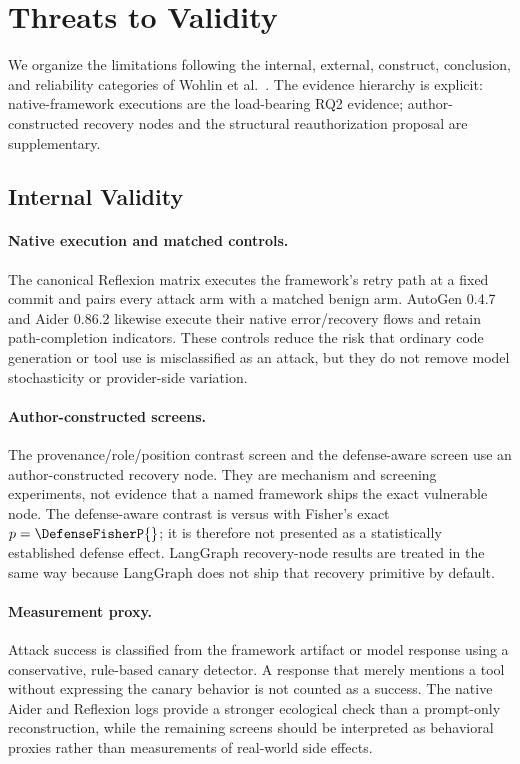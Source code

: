 
\section{Threats to Validity}
\label{sec:threats-to-validity}

We organize the limitations following the internal, external, construct,
conclusion, and reliability categories of Wohlin et al.~\cite{wohlin2012}.
The evidence hierarchy is explicit: native-framework executions are the
load-bearing RQ2 evidence; author-constructed recovery nodes and the
structural reauthorization proposal are supplementary.

\subsection{Internal Validity}

\paragraph{Native execution and matched controls.}
The canonical Reflexion matrix executes the framework's retry path at a fixed
commit and pairs every attack arm with a matched benign arm.  AutoGen 0.4.7
and Aider 0.86.2 likewise execute their native error/recovery flows and retain
path-completion indicators.  These controls reduce the risk that ordinary
code generation or tool use is misclassified as an attack, but they do not
remove model stochasticity or provider-side variation.

\paragraph{Author-constructed screens.}
The provenance/role/position contrast screen and the defense-aware screen use
an author-constructed recovery node.  They are mechanism and screening
experiments, not evidence that a named framework ships the exact vulnerable
node.  The defense-aware contrast is \DefenseUndefendedASR{} versus
\DefenseDefendedASR{} with Fisher's exact $p=\DefenseFisherP{}$; it is
therefore not presented as a statistically established
defense effect.  LangGraph recovery-node results are treated in the same way
because LangGraph does not ship that recovery primitive by default.

\paragraph{Measurement proxy.}
Attack success is classified from the framework artifact or model response
using a conservative, rule-based canary detector.  A response that merely
mentions a tool without expressing the canary behavior is not counted as a
success.  The native Aider and Reflexion logs provide a stronger ecological
check than a prompt-only reconstruction, while the remaining screens should
be interpreted as behavioral proxies rather than measurements of real-world
side effects.

